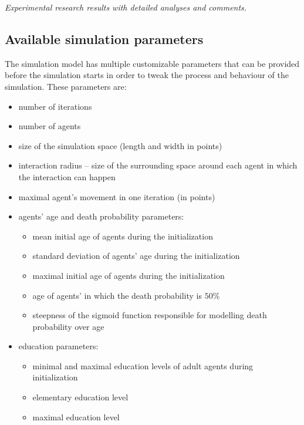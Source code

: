 \documentclass[english]{projectreport}
\begin{document}

\emph{Experimental research results with detailed analyses and comments.}

\subsection{Available simulation parameters}

    The simulation model has multiple customizable parameters that can be provided before the simulation starts in order to tweak the process and behaviour of the simulation. These parameters are:

    \begin{itemize}
        \item number of iterations
        \item number of agents
        \item size of the simulation space (length and width in points)
        \item interaction radius – size of the surrounding space around each agent in which the interaction can happen
        \item maximal agent's movement in one iteration (in points)
        \item agents' age and death probability parameters:
            \begin{itemize}
                \item mean initial age of agents during the initialization
                \item standard deviation of agents' age during the initialization
                \item maximal initial age of agents during the initialization
                \item age of agents' in which the death probability is $50\%$
                \item steepness of the sigmoid function responsible for modelling death probability over age
            \end{itemize}
        \item education parameters:
            \begin{itemize}
                \item minimal and maximal education levels of adult agents during initialization
                \item elementary education level
                \item maximal education level

\end{itemize}
\end{itemize}
\end{document}
